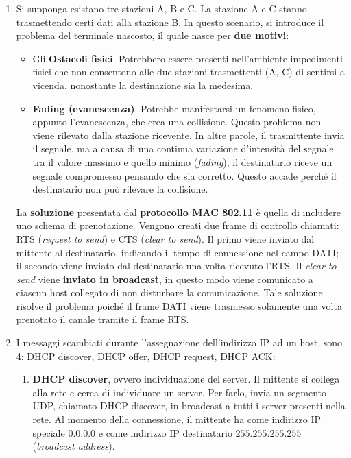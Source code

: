 \documentclass[a4paper]{article}
\begin{document}
	\begin{enumerate}
		\item Si supponga esistano tre stazioni A, B e C. La stazione A e C stanno trasmettendo certi dati alla stazione B. In questo scenario, si introduce il problema del terminale nascosto, il quale nasce per \textbf{due motivi}:
		\begin{itemize}
			\item Gli \textbf{Ostacoli fisici}. Potrebbero essere presenti nell'ambiente impedimenti fisici che non consentono alle due stazioni trasmettenti (A, C) di sentirsi a vicenda, nonostante la destinazione sia la medesima.
			
			\item \textbf{Fading (evanescenza)}. Potrebbe manifestarsi un fenomeno fisico, appunto l'evanescenza, che crea una collisione. Questo problema non viene rilevato dalla stazione ricevente.\newline
			In altre parole, il trasmittente invia il segnale, ma a causa di una continua variazione d'intensità del segnale tra il valore massimo e quello minimo (\emph{fading}), il destinatario riceve un segnale compromesso pensando che sia corretto. Questo accade perché il destinatario non può rilevare la collisione.
		\end{itemize}
		La \textbf{soluzione} presentata dal \textbf{protocollo MAC 802.11} è quella di includere uno schema di prenotazione. Vengono creati due frame di controllo chiamati: RTS (\emph{request to send}) e CTS (\emph{clear to send}). Il primo viene inviato dal mittente al destinatario, indicando il tempo di connessione nel campo DATI; il secondo viene inviato dal destinatario una volta ricevuto l'RTS. Il \emph{clear to send} viene \textbf{inviato in broadcast}, in questo modo viene comunicato a ciascun host collegato di non disturbare la comunicazione.\newline
		Tale soluzione risolve il problema poiché il frame DATI viene trasmesso solamente una volta prenotato il canale tramite il frame RTS.\newpage
		
		\item I messaggi scambiati durante l'assegnazione dell'indirizzo IP ad un host, sono 4: DHCP discover, DHCP offer, DHCP request, DHCP ACK:
		\begin{enumerate}
			\item \textbf{DHCP discover}, ovvero individuazione del server. Il mittente si collega alla rete e cerca di individuare un server. Per farlo, invia un segmento UDP, chiamato DHCP discover, in broadcast a tutti i server presenti nella rete. Al momento della connessione, il mittente ha come indirizzo IP speciale $0.0.0.0$ e come indirizzo IP destinatario $255.255.255.255$ (\emph{broadcast address}).
			

\end{enumerate}
\end{enumerate}
\end{document}
